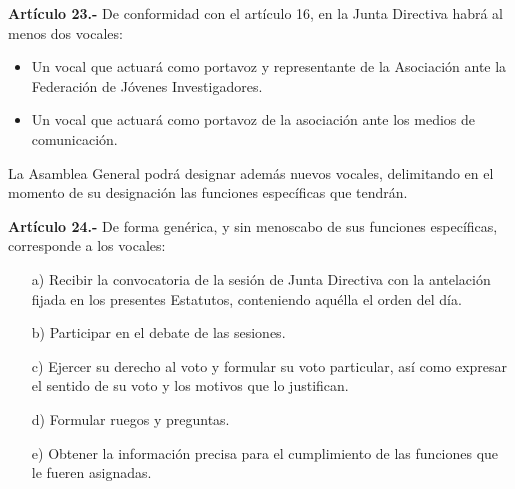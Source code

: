 \documentclass[a4paper,12pt]{article}
\begin{document}
\begin{onehalfspace}
\bigskip\bigskip

\textbf{Artículo 23.-} De conformidad con el artículo 16, en la Junta Directiva habrá al menos dos vocales:
\begin{itemize}
\item  Un vocal que actuará como portavoz y representante de la Asociación ante la Federación de Jóvenes Investigadores.
\item  Un vocal que actuará como portavoz de la asociación ante los medios de comunicación.
\end{itemize}

La Asamblea General podrá designar además nuevos vocales, delimitando en el momento de su designación las funciones específicas que tendrán.

\bigskip\bigskip

\textbf{Artículo 24.-} De forma genérica, y sin menoscabo de sus funciones específicas, corresponde a los vocales:
\begin{itemize}
\item [a)] Recibir la convocatoria de la sesión de Junta Directiva con la antelación fijada en los presentes Estatutos, conteniendo aquélla el orden del día.
\item [b)] Participar en el debate de las sesiones.
\item [c)] Ejercer su derecho al voto y formular su voto particular, así como expresar el sentido de su voto y los motivos que lo justifican.
\item [d)] Formular ruegos y preguntas.
\item [e)] Obtener la información precisa para el cumplimiento de las funciones que le fueren asignadas.
\end{itemize}


\end{onehalfspace}
\end{document}
